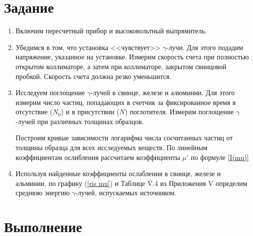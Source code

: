 \documentclass[a4paper, 12pt]{article}%
\begin{document}
	\section{Задание}

	\begin{enumerate}
	\item Включим пересчетный прибор и высоковольтный выпрямитель.
	
	\item Убедимся в том, что установка <<чувствует>> $\gamma$-лучи. Для этого подадим напряжение, указанное на установке. Измерим скорость счета при полностью открытом коллиматоре, а затем при коллиматоре, закрытом свинцовой пробкой. Скорость счета должна резко уменьшится.
	
	\item Исследуем поглощение $\gamma$-лучей в свинце, железе и алюминии. Для этого измерим число частиц, попадающих в счетчик за фиксированное время в отсутствие  ($N_0$) и в присутствии ($N$) поглотителя. Измерим поглощение $\gamma$-лучей при различных толщинах образцов.
	
	Построим кривые зависимости логарифма числа сосчитанных частиц от толщины образца для всех исследуемых веществ. По линейным коэффициентам ослибления рассчитаем коэффициенты $\mu '$ по формуле \eqref{I(mu)}
	
	\item Используя найденные коэффициенты ослабления в свинце, железе и альминии, по графику (\ref{ris mu}) и Таблице V.4 из Приложения V определим среднюю энергию $\gamma$-лучей, испускаемых источником.
	\end{enumerate}
	
	\section{Выполнение}
	
\end{document}
